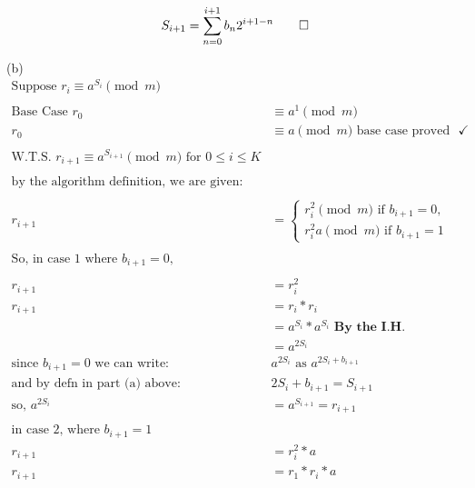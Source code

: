 \documentclass{assignment}
\begin{document}
\begin{flushleft}
\begin{problemlist}
\begin{flushleft}
\begin{align*}
S_{i+1} &= \sum_{n=0}^{i+1} b_n2^{i+1-n} \qed\\ 
\end{align*}
\end{flushleft}
\item[(b)] 
\begin{align*}
\text{Suppose } r_i \equiv a^{S_i} \pmod{m}\\
\hspace{1cm}\\
\text{Base Case } r_0 &\equiv a^1 \pmod{m}\\
r_0 &\equiv a \pmod{m}\text{  base case proved} \text{ }\checkmark\\
\hspace{1cm}\\
\text{W.T.S. } r_{i+1} \equiv a^{S_{i+1}} \pmod{m} \text{ for } 0 \leq i \leq K \\
\hspace{1cm}\\
\text{by the algorithm definition, we are given: }\\
\hspace{1cm}\\
r_{i+1} &= \begin{cases}r^{2}_i \pmod{m} \text{ if } b_{i+1} = 0,\\
r^{2}_ia \pmod{m} \text{ if } b_{i+1} = 1\end{cases}\\
\hspace{1cm}\\
\text{So, in case 1 where } b_{i+1} = 0\text{,}\\
\hspace{1cm}\\
r_{i+1} &= r^{2}_{i}\\
r_{i+1} &= r_i * r_i\\
&= a^{S_i} * a^{S_i} \textbf{ By the I.H.}\\
&=a^{2S_i}\\
\text{since } b_{i+1} = 0 \text{ we can write: } &a^{2S_i} \text{ as } a^{2S_{i} + b_{i+1}}\\
\text{and by defn in part (a) above: } &2S_i + b_{i+1} = S_{i+1}\\
\text{so, } a^{2S_i} &= a^{S_{i+1}} = r_{i+1}\\
\hspace{1cm}\\
\text{in case 2, where } b_{i+1} = 1\\
r_{i+1} &= r^{2}_{i} * a\\
r_{i+1} &= r_1 * r_i  * a\\

\end{align*}
\end{problemlist}
\end{flushleft}
\end{document}
